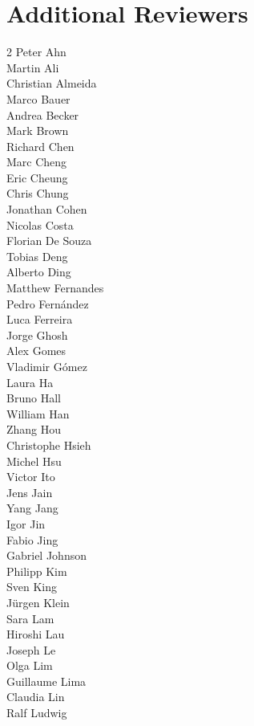 \documentclass[runningheads]{llncs}
\begin{document}
\section*{Additional Reviewers}
\begin{multicols}{2}
\noindent Peter Ahn\\
Martin Ali\\
Christian Almeida\\
Marco Bauer\\
Andrea Becker\\
Mark Brown\\
Richard Chen\\
Marc Cheng\\
Eric Cheung\\
Chris Chung\\
Jonathan Cohen\\
Nicolas Costa\\
Florian De Souza\\
Tobias Deng\\
Alberto Ding\\
Matthew Fernandes\\
Pedro Fern\'{a}ndez\\
Luca Ferreira\\
Jorge Ghosh\\
Alex Gomes\\
Vladimir G\'{o}mez\\
Laura Ha\\
Bruno Hall\\
William Han\\
Zhang Hou\\
Christophe Hsieh\\
Michel Hsu\\
Victor Ito\\
Jens Jain\\
Yang Jang\\
Igor Jin\\
Fabio Jing\\
Gabriel Johnson\\
Philipp Kim\\
Sven King\\
J\"{u}rgen Klein\\
Sara Lam\\
Hiroshi Lau\\
Joseph Le\\
Olga Lim\\
Guillaume Lima\\
Claudia Lin\\
Ralf Ludwig\\

\end{multicols}
\end{document}

